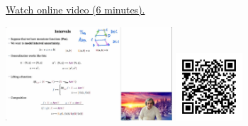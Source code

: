 
\begin{minipage}{10cm}
    \href{https://act4e-spring21.netlify.app/videos/spring2021-monads-a:intervals.html}{Watch online video (6 minutes).}
        
    \href{https://act4e-spring21.netlify.app/videos/spring2021-monads-a:intervals.html}{\includegraphics[height=3.5cm]{spring2021-monads-a:intervals/thumbnails.jpg}}
    \href{https://act4e-spring21.netlify.app/videos/spring2021-monads-a:intervals.html}{\includegraphics[height=2.5cm]{spring2021-monads-a:intervals/qrcode.png}}
\end{minipage}
